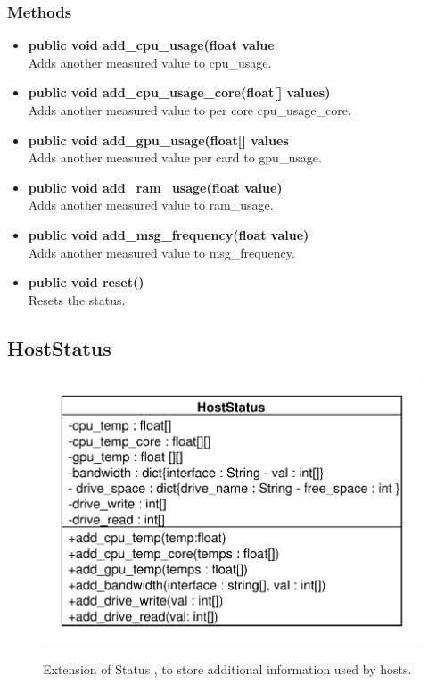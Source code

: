 \subsubsection{Methods}
\begin{itemize}
	\item \textbf{public void add\_cpu\_usage(float value}\\
	Adds another measured value to cpu\_usage.
	\item \textbf{public void add\_cpu\_usage\_core(float[] values)}\\
	Adds another measured value to per core cpu\_usage\_core.
	\item \textbf{public void add\_gpu\_usage(float[] values}\\
	Adds another measured value per card to gpu\_usage.
	\item \textbf{public void add\_ram\_usage(float value)}\\
	Adds another measured value to ram\_usage.
	\item \textbf{public void add\_msg\_frequency(float value)}\\
	Adds another measured value to msg\_frequency.
	\item \textbf{public void reset()}\\
	Resets the status.
\end{itemize}

\subsection{HostStatus}

\begin{figure}[htbp]
	\begin{minipage}[t]{7cm}
		\vspace{0pt}
		\centering
		\includegraphics[scale=0.6]{./diagram_pictures/NodeInterface/HostStatus.pdf}
	\end{minipage}
	\hfill
	\begin{minipage}[t]{7cm}
		\vspace{10pt}
		Extension of Status , to store additional information used by hosts.
	\end{minipage}
\end{figure}


